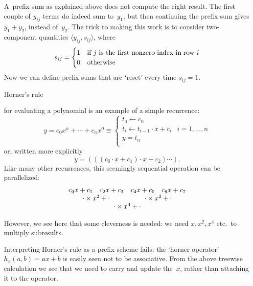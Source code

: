A~prefix sum as explained above does not compute the right result. The first couple of $y_{ij}$ terms
do indeed sum to~$y_1$, but then continuing the prefix sum gives $y_1+y_2$, instead of~$y_2$.
The trick to making this work is to consider two-component quantities $\langle y_{ij},s_{ij}\rangle$,
where
\[ s_{ij} =
\begin{cases}
1&\hbox{if $j$ is the first nonzero index in row $i$}\\ 0&\hbox{otherwise}
\end{cases}
\]
Now we can define prefix sums that are `reset' every time $s_{ij}=1$.


 {Horner's rule}
\label{sec:horner}

for evaluating a polynomial is an example of a simple recurrence:
\begin{equation}
  y = c_0 x^n +\cdots+ c_n x^0 \equiv
  \begin{cases}
    t_0 \leftarrow c_0\\
    t_i \leftarrow t_{i-1}\cdot x + c_i&i=1,\ldots,n\\
    y = t_n\\
  \end{cases}
\end{equation}
or, written more explicitly
\[ y = \left(\left( ( c_0\cdot x + c_1 ) \cdot x + c_2 \right) \cdots \right)
   .
\]
Like many other recurrences, this seemingly sequential operation
can be parallelized:
\[
\begin{array}{cccc}
  c_0 x + c_1 & c_2 x + c_3 & c_4 x + c_5 & c_6 x + c_7\\
  \multicolumn{2}{c}{\cdot \times x^2 + \cdot}&
    \multicolumn{2}{c}{\cdot \times x^2 + \cdot}\\
  \multicolumn{4}{c}{\cdot \times x^4 + \cdot}\\
\end{array}
\]

However, we see here that some cleverness is needed:
we need $x,x^2,x^4$ etc.\ to multiply subresults.

Interpreting Horner's rule as a prefix scheme fails:
the `horner operator' $h_x(a,b)=ax+b$ is easily seen
not to be associative.
From the above treewise calculation we see that we
need to carry and update the~$x$,
rather than attaching it to the operator.

